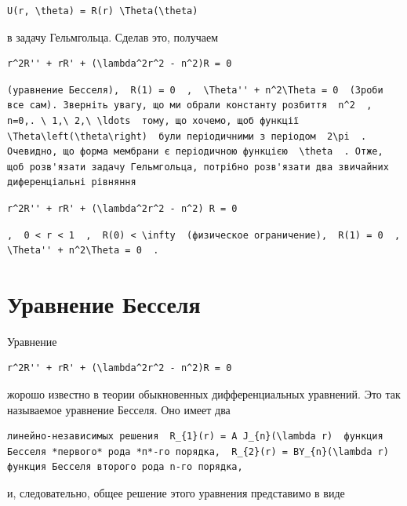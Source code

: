 \documentclass[
  ukrainian,
]{article}
\begin{document}
\begin{verbatim}
U(r, \theta) = R(r) \Theta(\theta)
\end{verbatim}

в задачу Гельмгольца. Сделав это, получаем

\begin{verbatim}
r^2R'' + rR' + (\lambda^2r^2 - n^2)R = 0
\end{verbatim}

\begin{verbatim}
(уравнение Бесселя),  R(1) = 0  ,  \Theta'' + n^2\Theta = 0  (Зроби все сам). Зверніть увагу, що ми обрали константу розбиття  n^2  ,  n=0,. \ 1,\ 2,\ \ldots  тому, що хочемо, щоб функції  \Theta\left(\theta\right)  були періодичними з періодом  2\pi  . Очевидно, що форма мембрани є періодичною функцією  \theta  . Отже, щоб розв'язати задачу Гельмгольца, потрібно розв'язати два звичайних диференціальні рівняння
\end{verbatim}

\begin{verbatim}
r^2R'' + rR' + (\lambda^2r^2 - n^2) R = 0
\end{verbatim}

\begin{verbatim}
,  0 < r < 1  ,  R(0) < \infty  (физическое ограничение),  R(1) = 0  ,  \Theta'' + n^2\Theta = 0  .
\end{verbatim}

\section{Уравнение
Бесселя}\label{ux443ux440ux430ux432ux43dux435ux43dux438ux435-ux431ux435ux441ux441ux435ux43bux44f}

Уравнение

\begin{verbatim}
r^2R'' + rR' + (\lambda^2r^2 - n^2)R = 0
\end{verbatim}

жорошо известно в теории обыкновенных дифференциальных уравнений. Это
так называемое уравнение Бесселя. Оно имеет два

\begin{verbatim}
линейно-независимых решения  R_{1}(r) = A J_{n}(\lambda r)  функция Бесселя *первого* рода *п*-го порядка,  R_{2}(r) = BY_{n}(\lambda r)  функция Бесселя второго рода n-го порядка,
\end{verbatim}

и, следовательно, общее решение этого уравнения представимо в виде
\end{document}
